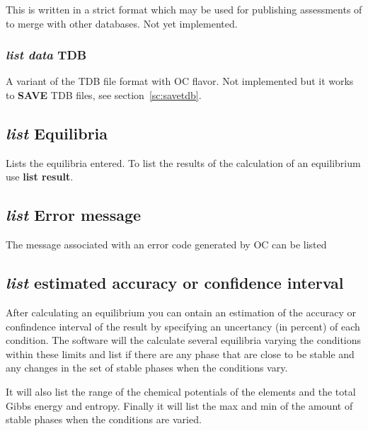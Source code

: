 \documentclass[11pt]{article}
\begin{document}
This is written in a strict format which may be used for publishing
assessments of to merge with other databases.  Not yet implemented.

\hypertarget{List data TDB}{}
\subsubsection{{\em list data} TDB}

A variant of the TDB file format with OC flavor.  Not implemented but
it works to {\bf SAVE} TDB files, see section~\ref{sc:savetdb}.


\hypertarget{list equilibria}{}
\subsection{{\em list} Equilibria}

Lists the equilibria entered.  To list the results of the calculation
of an equilibrium use {\bf list result}.

\hypertarget{List error msg}{}
\subsection{{\em list} Error message}

The message associated with an error code generated by OC can be listed

\hypertarget{List confidence interval}{}
\subsection{{\em list} estimated accuracy or confidence interval}

After calculating an equilibrium you can ontain an estimation of the
accuracy or confindence interval of the result by specifying an
uncertancy (in percent) of each condition.  The software will the
calculate several equilibria varying the conditions within these
limits and list if there are any phase that are close to be stable and
any changes in the set of stable phases when the conditions vary.

It will also list the range of the chemical potentials of the elements
and the total Gibbs energy and entropy.  Finally it will list the max
and min of the amount of stable phases when the conditions are varied.

\hypertarget{List excell CSV}{}
\end{document}
